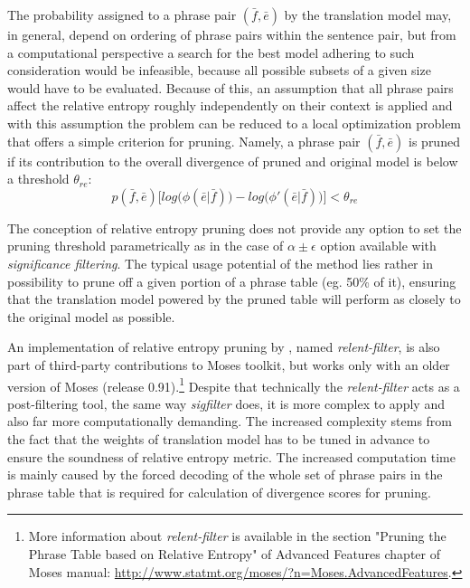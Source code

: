 The probability assigned to a phrase pair $(\bar{f},\bar{e})$ by the translation model
may, in general, depend on ordering of phrase pairs within the sentence pair, but from
a computational perspective a search for the best model adhering to such consideration
would be infeasible, because all possible subsets of a given size would have to be evaluated.
Because of this, an assumption that all phrase pairs affect the relative entropy roughly
independently on their context is applied and with this assumption the problem can be
reduced to a local optimization problem that offers a simple criterion for pruning.
Namely, a phrase pair $(\bar{f},\bar{e})$ is pruned if its contribution to the overall
divergence of pruned and original model is below a threshold $\theta_{re}$:
\begin{equation}
  p(\bar{f},\bar{e}) \Big[log\big(\phi(\bar{e}|\bar{f})\big) - log\big(\phi'(\bar{e}|\bar{f})\big)\Big] < \theta_{re}
\end{equation}

The conception of relative entropy pruning does not provide any option to set
the pruning threshold parametrically as in the case of $\alpha \pm \epsilon$ option
available with \emph{significance filtering}.
The typical usage potential of the method lies rather in possibility to prune off
a given portion of a phrase table (eg. 50\% of it), ensuring that the translation model
powered by the pruned table will perform as closely to the original model as possible.

An implementation of relative entropy pruning by \citet{ling:relentfilter}, named
\emph{relent-filter}, is also part of third-party contributions to Moses toolkit,
but works only with an older version of Moses (release 0.91).\footnote{More information
about \emph{relent-filter} is available in the section "Pruning the Phrase Table based
on Relative Entropy" of Advanced Features chapter of Moses manual:
\url{http://www.statmt.org/moses/?n=Moses.AdvancedFeatures}.}
Despite that technically the \emph{relent-filter} acts as a post-filtering tool,
the same way \emph{sigfilter} does, it is more complex to apply and also far more
computationally demanding.
The increased complexity stems from the fact that the weights of translation model has to
be tuned in advance to ensure the soundness of relative entropy metric.
The increased computation time is mainly caused by the forced decoding of the whole set of
phrase pairs in the phrase table that is required for calculation of divergence scores for
pruning.

